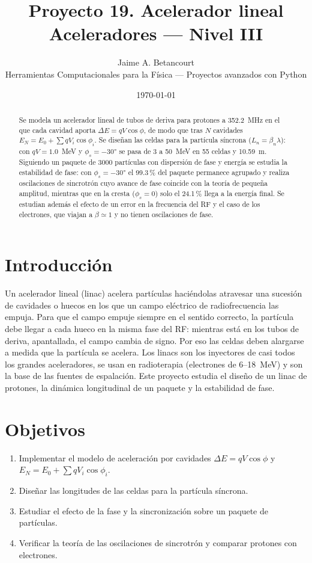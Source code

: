 \documentclass[11pt,a4paper]{article}
\title{\textbf{Proyecto 19. Acelerador lineal}\\[4pt]\large Aceleradores --- Nivel III}
\author{Jaime A. Betancourt\\\small Herramientas Computacionales para la Física --- Proyectos avanzados con Python}
\date{\today}
\begin{document}
\maketitle
\begin{abstract}
Se modela un acelerador lineal de tubos de deriva para protones a \num{352.2}~MHz en el que cada cavidad aporta
$\Delta E=qV\cos\phi$, de modo que tras $N$ cavidades $E_N=E_0+\sum qV_i\cos\phi_i$. Se diseñan las celdas para la partícula
síncrona ($L_n=\beta_n\lambda$): con $qV=\num{1.0}$~MeV y $\phi_s=-30°$ se pasa de \num{3} a \num{50}~MeV en 55 celdas y \num{10.59}~m. Siguiendo un
paquete de \num{3000} partículas con dispersión de fase y energía se estudia la estabilidad de fase: con $\phi_s=-30°$ el \num{99.3}\,\% del
paquete permanece agrupado y realiza oscilaciones de sincrotrón cuyo avance de fase coincide con la teoría de pequeña amplitud,
mientras que en la cresta ($\phi_s=0$) solo el \num{24.1}\,\% llega a la energía final. Se estudian además el efecto de un error en la
frecuencia del RF y el caso de los electrones, que viajan a $\beta\simeq1$ y no tienen oscilaciones de fase.
\end{abstract}
\tableofcontents
\newpage
\section{Introducción}

Un acelerador lineal (linac) acelera partículas haciéndolas atravesar una sucesión de cavidades o huecos en los que un campo
eléctrico de radiofrecuencia las empuja. Para que el campo empuje siempre en el sentido correcto, la partícula debe llegar a
cada hueco en la misma fase del RF: mientras está en los tubos de deriva, apantallada, el campo cambia de signo. Por eso las
celdas deben alargarse a medida que la partícula se acelera. Los linacs son los inyectores de casi todos los grandes
aceleradores, se usan en radioterapia (electrones de 6--18~MeV) y son la base de las fuentes de espalación. Este proyecto
estudia el diseño de un linac de protones, la dinámica longitudinal de un paquete y la estabilidad de fase.

\section{Objetivos}

\begin{enumerate}
\item Implementar el modelo de aceleración por cavidades $\Delta E=qV\cos\phi$ y $E_N=E_0+\sum qV_i\cos\phi_i$.
\item Diseñar las longitudes de las celdas para la partícula síncrona.
\item Estudiar el efecto de la fase y la sincronización sobre un paquete de partículas.
\item Verificar la teoría de las oscilaciones de sincrotrón y comparar protones con electrones.
\end{enumerate}
\end{document}
